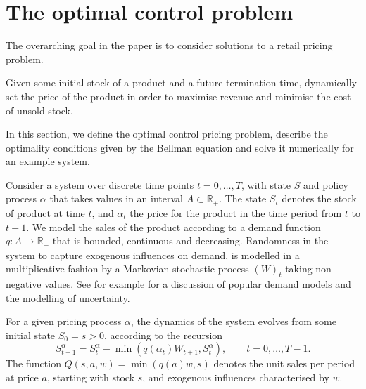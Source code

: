 \documentclass[main.tex]{subfiles}
\begin{document}
\listoftodos

\section{The optimal control problem}
The overarching goal in the paper is to consider solutions to a retail
pricing problem.
\begin{mydef}
  Given some initial stock of a product and a future termination time,
  dynamically set the price
  of the product in order to maximise revenue and minimise the cost of
  unsold stock.
\end{mydef}
In this section, we define the optimal control pricing problem,
describe the optimality conditions given by the Bellman equation and
solve it numerically for an example system.

Consider a system over discrete time points $t=0,\dots,T$, with state
$S$ and policy process $\alpha$ that takes values in an
interval $A\subset\mathbb R_+$.
The state $S_t$ denotes the stock of product at time $t$, and
$\alpha_t$ the price for the product in the time period from $t$ to
$t+1$. We model the sales of the product according to a demand
function $q:A\to\mathbb R_+$ that is bounded, continuous and decreasing.
Randomness in the system to capture exogenous influences on demand, is
modelled in a multiplicative fashion by a Markovian stochastic process
$(W)_t$ taking non-negative values. See for example
\citet[Ch.~7]{talluri2006theory} for a discussion of
popular demand models and the modelling of uncertainty.

For a given pricing process $\alpha$, the dynamics of
the system evolves from some initial state $S_0=s>0$, according to the
recursion
\begin{equation}\label{eq:stock_dynamics}
  S_{t+1}^\alpha=S_t^\alpha-\min(q(\alpha_t)W_{t+1},S_t^\alpha),\qquad t=0,\dots,T-1.
\end{equation}
The function $Q(s,a,w)=\min(q(a)w,s)$ denotes the unit sales per
period at price $a$,
starting with stock $s$, and exogenous influences
characterised by $w$.
\end{document}
